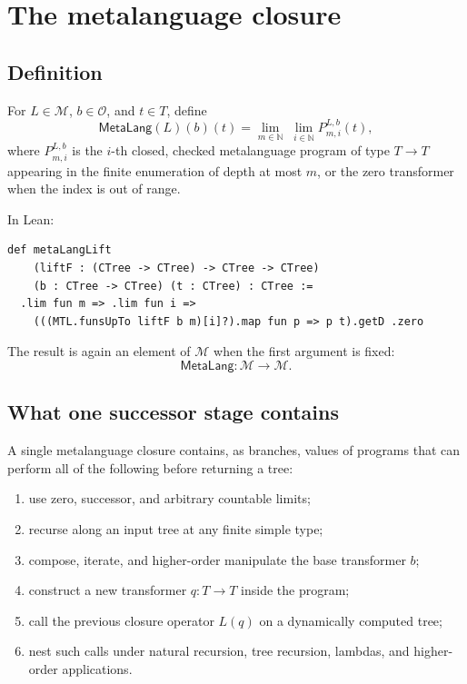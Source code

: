 \documentclass[11pt]{article}
\theoremstyle{definition}
\newcommand{\Nat}{\mathbb{N}}
\newcommand{\Op}{\mathcal{O}}
\newcommand{\MOp}{\mathcal{M}}
\newcommand{\MetaLang}{\mathsf{MetaLang}}
\begin{document}
\section{The metalanguage closure}

\subsection{Definition}

For \(L\in\MOp\), \(b\in\Op\), and \(t\in T\), define
\[
  \MetaLang(L)(b)(t)
  = \lim_{m\in\Nat}\;\lim_{i\in\Nat}
      P^{L,b}_{m,i}(t),
\]
where \(P^{L,b}_{m,i}\) is the \(i\)-th closed, checked metalanguage program of
type \(T\to T\) appearing in the finite enumeration of depth at most \(m\), or
the zero transformer when the index is out of range.

In Lean:
\begin{lstlisting}
def metaLangLift
    (liftF : (CTree -> CTree) -> CTree -> CTree)
    (b : CTree -> CTree) (t : CTree) : CTree :=
  .lim fun m => .lim fun i =>
    (((MTL.funsUpTo liftF b m)[i]?).map fun p => p t).getD .zero
\end{lstlisting}
The result is again an element of \(\MOp\) when the first argument is fixed:
\[
  \MetaLang : \MOp\to\MOp.
\]

\subsection{What one successor stage contains}

A single metalanguage closure contains, as branches, values of programs that
can perform all of the following before returning a tree:
\begin{enumerate}[leftmargin=2.3em]
  \item use zero, successor, and arbitrary countable limits;
  \item recurse along an input tree at any finite simple type;
  \item compose, iterate, and higher-order manipulate the base transformer
  \(b\);
  \item construct a new transformer \(q:T\to T\) inside the program;
  \item call the previous closure operator \(L(q)\) on a dynamically computed
  tree;
  \item nest such calls under natural recursion, tree recursion, lambdas, and
  higher-order applications.
\end{enumerate}
\end{document}
